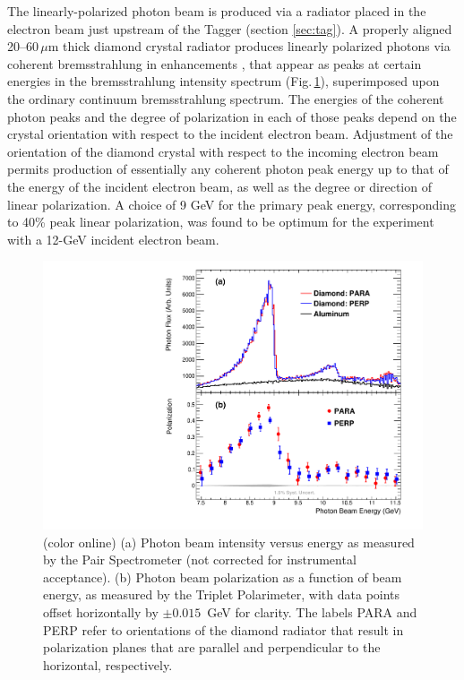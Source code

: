 


The linearly-polarized photon beam is produced via a radiator placed in the electron beam just upstream of the
Tagger (section \ref{sec:tag}). A properly aligned 20--60\,$\mu$m thick diamond crystal
radiator produces
linearly polarized photons via coherent brems\-strah\-lung in enhancements \cite{timm1969,LIVINGSTON2009205},
that appear as peaks at certain energies in the brems\-strah\-lung intensity spectrum (Fig.\,\ref{fig:beam:gx3102_pi0etaAsym2016_fig0_beam}), superimposed upon the ordinary  continuum brems\-strah\-lung spectrum.
The energies of the coherent photon peaks and the degree of polarization in each of those peaks depend on the crystal orientation with respect to the incident electron beam.
Adjustment of the orientation of the diamond crystal with respect to the incoming
electron beam permits production of essentially any coherent photon peak energy up to that of the energy of the incident electron beam, as well as the
degree or direction of linear polarization.
A choice of 9 GeV for the primary peak energy, corresponding to 40\% peak linear polarization,
was found to be optimum for the \GX{} experiment with a 12-GeV incident electron beam.

\begin{figure}[tbp]
\begin{center}
 \includegraphics[clip=true,width=0.5\linewidth]{figures/gx3102_pi0etaAsym2016_fig0_beam.pdf}
\end{center}
\caption{(color online) (a) Photon beam intensity versus energy as measured by the Pair Spectrometer
(not corrected for instrumental acceptance).  (b) Photon beam polarization as a function of beam energy,
as measured by the Triplet Polarimeter, with data points offset horizontally by $\pm0.015$~GeV for clarity.
The labels PARA and PERP refer to orientations of the diamond radiator that result in polarization
planes that are parallel and perpendicular to the horizontal, respectively.
        }
\label{fig:beam:gx3102_pi0etaAsym2016_fig0_beam} 
\end{figure}

